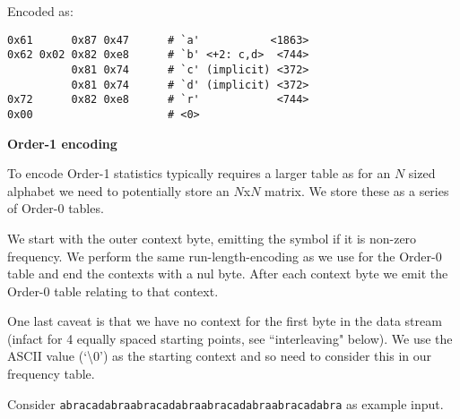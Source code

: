 \documentclass[a4paper]{article}
\begin{document}
Encoded as:
\begin{verbatim}
0x61      0x87 0x47      # `a'           <1863>
0x62 0x02 0x82 0xe8      # `b' <+2: c,d>  <744>
          0x81 0x74      # `c' (implicit) <372> 
          0x81 0x74      # `d' (implicit) <372> 
0x72      0x82 0xe8      # `r'            <744> 
0x00                     # <0>          
\end{verbatim}


\textbf{Order-1 encoding}

To encode Order-1 statistics typically requires a larger table as for
an $N$ sized alphabet we need to potentially store an $N$x$N$ matrix.
We store these as a series of Order-0 tables.

We start with the outer context byte, emitting the symbol if it is
non-zero frequency.  We perform the same run-length-encoding as we
use for the Order-0 table and end the contexts with a nul byte.  After
each context byte we emit the Order-0 table relating to that context.

One last caveat is that we have no context for the first byte in the
data stream (infact for 4 equally spaced starting points, see
``interleaving" below).  We use the ASCII value (`\textbackslash0') as
the starting context and so need to consider this in our frequency
table.

Consider \texttt{abracadabraabracadabraabracadabraabracadabra} as
example input.
\end{document}
